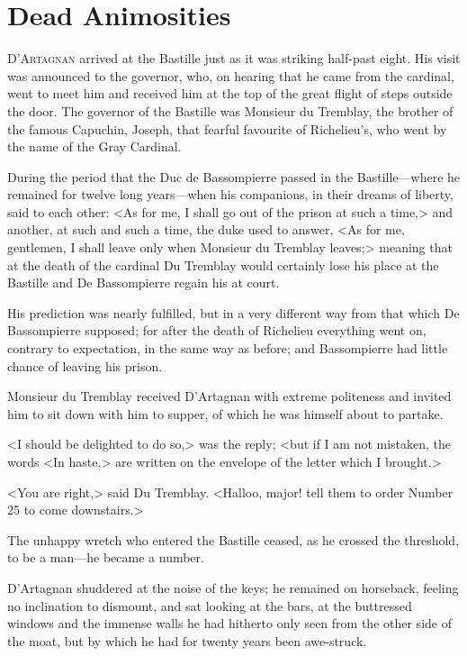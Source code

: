 \chapter{Dead Animosities}

 \lettrine{D}{'Artagnan} arrived at the Bastille just as it was striking half-past eight. His visit was announced to the governor, who, on hearing that he came from the cardinal, went to meet him and received him at the top of the great flight of steps outside the door. The governor of the Bastille was Monsieur du Tremblay, the brother of the famous Capuchin, Joseph, that fearful favourite of Richelieu's, who went by the name of the Gray Cardinal.

During the period that the Duc de Bassompierre passed in the Bastille—where he remained for twelve long years—when his companions, in their dreams of liberty, said to each other: <As for me, I shall go out of the prison at such a time,> and another, at such and such a time, the duke used to answer, <As for me, gentlemen, I shall leave only when Monsieur du Tremblay leaves;> meaning that at the death of the cardinal Du Tremblay would certainly lose his place at the Bastille and De Bassompierre regain his at court.

His prediction was nearly fulfilled, but in a very different way from that which De Bassompierre supposed; for after the death of Richelieu everything went on, contrary to expectation, in the same way as before; and Bassompierre had little chance of leaving his prison.

Monsieur du Tremblay received D'Artagnan with extreme politeness and invited him to sit down with him to supper, of which he was himself about to partake.

<I should be delighted to do so,> was the reply; <but if I am not mistaken, the words <In haste,> are written on the envelope of the letter which I brought.>

<You are right,> said Du Tremblay. <Halloo, major! tell them to order Number 25 to come downstairs.>

The unhappy wretch who entered the Bastille ceased, as he crossed the threshold, to be a man—he became a number.

D'Artagnan shuddered at the noise of the keys; he remained on horseback, feeling no inclination to dismount, and sat looking at the bars, at the buttressed windows and the immense walls he had hitherto only seen from the other side of the moat, but by which he had for twenty years been awe-struck.

